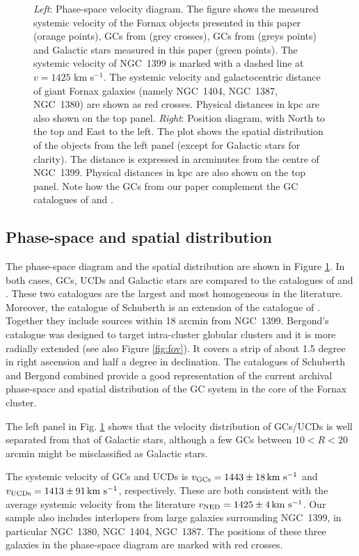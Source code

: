 \documentclass[useAMS,usenatbib]{mn2e}
\newcommand{\kms}{\mbox{\,km~s$^{-1}$}}
\begin{document}
\begin{figure}
\caption{\textit{Left}: Phase-space velocity diagram. The figure shows the measured systemic velocity of the Fornax objects presented in this paper (orange points), GCs from \citet{Schuberth} (grey crosses), GCs from \citet{Bergond07} (greys points) and Galactic stars measured in this paper (green points). The systemic velocity of NGC~1399 is marked with a dashed line at $v = 1425$ km s$^{-1}$. The systemic velocity and galactocentric distance of giant Fornax galaxies (namely NGC~1404, NGC~1387, NGC~1380) are shown as red crosses. Physical distances in kpc are also shown on the top panel. \textit{Right}: Position diagram, with North to the top and East to the left. The plot shows the spatial distribution of the objects from the left panel (except for Galactic stars for clarity). The distance is expressed in arcminutes from the centre of NGC~1399. Physical distances in kpc are also shown on the top panel.  Note how the GCs from our paper complement the GC catalogues of \citet{Schuberth} and \citet{Bergond07}. }
\label{fig:phase-space}
\end{figure}

\subsection{Phase-space and spatial distribution}

The phase-space diagram and the spatial distribution are shown in Figure \ref{fig:phase-space}. In both cases, GCs, UCDs and Galactic stars are compared to the catalogues of \citet{Bergond07} and \citet{Schuberth}. These two catalogues are the largest and most homogeneous in the literature. Moreover, the catalogue of Schuberth is an extension of the catalogue of \citet{Dirsch04}. Together they include sources within 18 arcmin from NGC~1399. Bergond's catalogue was designed to target intra-cluster globular clusters and it is more radially extended (see also Figure \ref{fig:fov}). It covers a strip of about 1.5 degree in right ascension and half a degree in declination. The catalogues of Schuberth and Bergond combined provide a good representation of the current archival phase-space and spatial distribution of the GC system in the core of the Fornax cluster. 

The left panel in Fig. \ref{fig:phase-space} shows that the velocity distribution of GCs/UCDs is well separated from that of Galactic stars, although a few GCs between $10<R<20$ arcmin might be misclassified as Galactic stars. 

The systemic velocity of GCs and UCDs is $v_{\rm GCs} = 1443 \pm 18 \kms$ and $v_{\rm UCDs} = 1413 \pm 91 \kms$, respectively. These are both consistent with the average systemic velocity from the literature $v_{\rm NED} = 1425 \pm 4 \kms$. Our sample also includes interlopers from large galaxies surrounding NGC~1399, in particular NGC~1380, NGC~1404, NGC~1387. The positions of these three galaxies in the phase-space diagram are marked with red crosses. 
\end{document}
